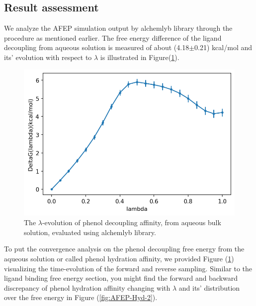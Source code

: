 \documentclass[9pt,tutorial]{livecoms}
\begin{document}
\subsection{Result assessment}
We analyze the AFEP simulation output by alchemlyb library through the procedure as mentioned earlier. The free energy difference of the ligand decoupling from aqueous solution is measured of about (4.18{$\pm$}0.21) kcal/mol and its’ evolution with respect to {$\lambda$} is illustrated in Figure(\ref{fig:AFEP-Hyd-1}).
\begin{figure}[h!t]
\centering
\includegraphics[width=0.9\linewidth]{Supp-Files/AFEP-Hydration/output/Alchemlyb/output_9_1.png}
\caption{The {$\lambda$}-evolution of phenol decoupling affinity, from aqueous bulk solution, evaluated using alchemlyb library.}
\label{fig:AFEP-Hyd-1}
\end{figure}

To put the convergence analysis on the phenol decoupling free energy from the aqueous solution or called phenol hydration affinity, we provided Figure (\ref{fig:AFEP-Hyd-1}) visualizing the time-evolution of the forward and reverse sampling. Similar to the ligand binding free energy section, you might find the forward and backward discrepancy of phenol hydration affinity changing with {$\lambda$} and its' distribution over the free energy in Figure (\ref{fig:AFEP-Hyd-2}).
\end{document}
